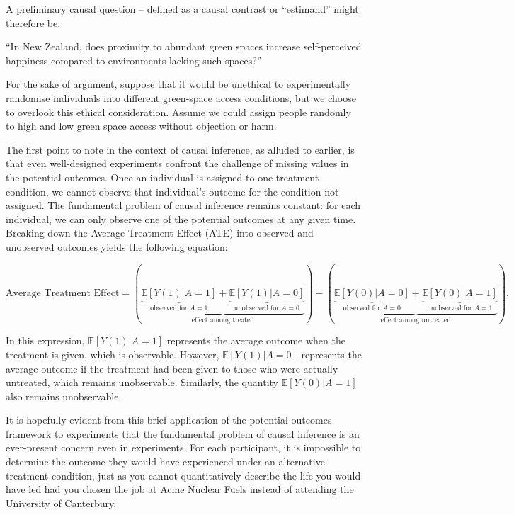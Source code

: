 \documentclass[
  singlecolumn]{article}
\begin{document}
A preliminary causal question -- defined as a causal contrast or
``estimand'' might therefore be:

``In New Zealand, does proximity to abundant green spaces increase
self-perceived happiness compared to environments lacking such spaces?''

For the sake of argument, suppose that it would be unethical to
experimentally randomise individuals into different green-space access
conditions, but we choose to overlook this ethical consideration. Assume
we could assign people randomly to high and low green space access
without objection or harm.

The first point to note in the context of causal inference, as alluded
to earlier, is that even well-designed experiments confront the
challenge of missing values in the potential outcomes. Once an
individual is assigned to one treatment condition, we cannot observe
that individual's outcome for the condition not assigned. The
fundamental problem of causal inference remains constant: for each
individual, we can only observe one of the potential outcomes at any
given time. Breaking down the Average Treatment Effect (ATE) into
observed and unobserved outcomes yields the following equation:

\[
\text{Average Treatment Effect} = \left(\underbrace{\underbrace{\mathbb{E}[Y(1)|A = 1]}_{\text{observed for } A = 1} + \underbrace{\mathbb{E}[Y(1)|A = 0]}_{\text{unobserved for } A = 0}}_{\text{effect among treated}}\right) - \left(\underbrace{\underbrace{\mathbb{E}[Y(0)|A = 0]}_{\text{observed for } A = 0} + \underbrace{\mathbb{E}[Y(0)|A = 1]}_{\text{unobserved for } A = 1}}_{\text{effect among untreated}}\right).
\]

In this expression, \(\mathbb{E}[Y(1)|A = 1]\) represents the average
outcome when the treatment is given, which is observable. However,
\(\mathbb{E}[Y(1)|A = 0]\) represents the average outcome if the
treatment had been given to those who were actually untreated, which
remains unobservable. Similarly, the quantity \(\mathbb{E}[Y(0)|A = 1]\)
also remains unobservable.

It is hopefully evident from this brief application of the potential
outcomes framework to experiments that the fundamental problem of causal
inference is an ever-present concern even in experiments. For each
participant, it is impossible to determine the outcome they would have
experienced under an alternative treatment condition, just as you cannot
quantitatively describe the life you would have led had you chosen the
job at Acme Nuclear Fuels instead of attending the University of
Canterbury.
\end{document}
